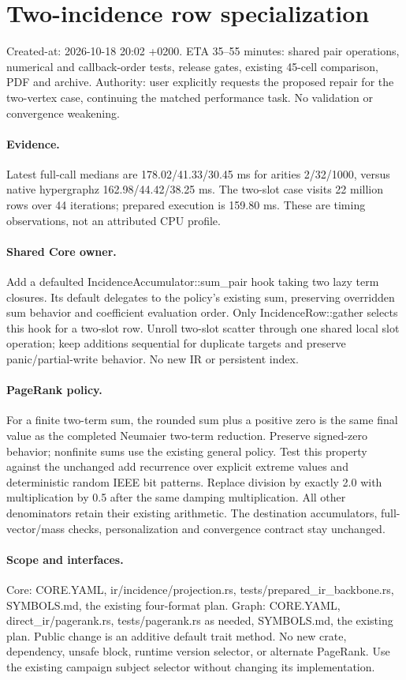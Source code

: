 \documentclass[11pt]{article}
\begin{document}
\newpage\section*{Two-incidence row specialization}
Created-at: 2026-10-18 20:02 +0200. ETA 35--55 minutes: shared pair operations, numerical and
callback-order tests, release gates, existing 45-cell comparison, PDF and archive.
Authority: user explicitly requests the proposed repair for the two-vertex case,
continuing the matched performance task. No validation or convergence weakening.
\paragraph{Evidence.} Latest full-call medians are 178.02/41.33/30.45 ms for
arities 2/32/1000, versus native hypergraphz 162.98/44.42/38.25 ms. The two-slot
case visits 22 million rows over 44 iterations; prepared execution is 159.80 ms.
These are timing observations, not an attributed CPU profile.
\paragraph{Shared Core owner.} Add a defaulted IncidenceAccumulator::sum\_pair
hook taking two lazy term closures. Its default delegates to the policy's existing
sum, preserving overridden sum behavior and coefficient evaluation order. Only
IncidenceRow::gather selects this hook for a two-slot row. Unroll two-slot scatter
through one shared local slot operation; keep additions sequential for duplicate
targets and preserve panic/partial-write behavior. No new IR or persistent index.
\paragraph{PageRank policy.} For a finite two-term sum, the rounded sum plus a
positive zero is the same final value as the completed Neumaier two-term reduction.
Preserve signed-zero behavior; nonfinite sums use the existing general policy.
Test this property against the unchanged add recurrence over explicit extreme
values and deterministic random IEEE bit patterns. Replace division by exactly
2.0 with multiplication by 0.5 after the same damping multiplication. All other
denominators retain their existing arithmetic. The destination accumulators,
full-vector/mass checks, personalization and convergence contract stay unchanged.
\paragraph{Scope and interfaces.} Core: CORE.YAML, ir/incidence/projection.rs,
tests/prepared\_ir\_backbone.rs, SYMBOLS.md, the existing four-format plan.
Graph: CORE.YAML, direct\_ir/pagerank.rs, tests/pagerank.rs as needed, SYMBOLS.md,
the existing plan. Public change is an additive default trait method. No new
crate, dependency, unsafe block, runtime version selector, or alternate PageRank.
Use the existing campaign subject selector without changing its implementation.
\end{document}
